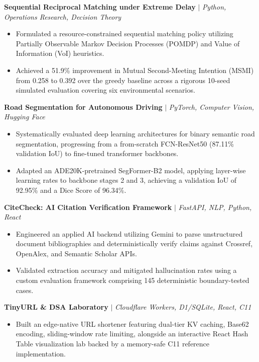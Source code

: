 \documentclass[10pt, a4paper]{article}
\begin{document}
\textbf{Sequential Reciprocal Matching under Extreme Delay} $|$ \textit{Python, Operations Research, Decision Theory}
\begin{itemize}[leftmargin=*, noitemsep, topsep=1pt, parsep=0pt]
    \item Formulated a resource-constrained sequential matching policy utilizing Partially Observable Markov Decision Processes (POMDP) and Value of Information (VoI) heuristics.
    \item Achieved a 51.9\% improvement in Mutual Second-Meeting Intention (MSMI) from 0.258 to 0.392 over the greedy baseline across a rigorous 10-seed simulated evaluation covering six environmental scenarios.
\end{itemize}

\textbf{Road Segmentation for Autonomous Driving} $|$ \textit{PyTorch, Computer Vision, Hugging Face}
\begin{itemize}[leftmargin=*, noitemsep, topsep=1pt, parsep=0pt]
    \item Systematically evaluated deep learning architectures for binary semantic road segmentation, progressing from a from-scratch FCN-ResNet50 (87.11\% validation IoU) to fine-tuned transformer backbones.
    \item Adapted an ADE20K-pretrained SegFormer-B2 model, applying layer-wise learning rates to backbone stages 2 and 3, achieving a validation IoU of 92.95\% and a Dice Score of 96.34\%.
\end{itemize}

\textbf{CiteCheck: AI Citation Verification Framework} $|$ \textit{FastAPI, NLP, Python, React}
\begin{itemize}[leftmargin=*, noitemsep, topsep=1pt, parsep=0pt]
    \item Engineered an applied AI backend utilizing Gemini to parse unstructured document bibliographies and deterministically verify claims against Crossref, OpenAlex, and Semantic Scholar APIs.
    \item Validated extraction accuracy and mitigated hallucination rates using a custom evaluation framework comprising 145 deterministic boundary-tested cases.
\end{itemize}

\textbf{TinyURL \& DSA Laboratory} $|$ \textit{Cloudflare Workers, D1/SQLite, React, C11}
\begin{itemize}[leftmargin=*, noitemsep, topsep=1pt, parsep=0pt]
    \item Built an edge-native URL shortener featuring dual-tier KV caching, Base62 encoding, sliding-window rate limiting, alongside an interactive React Hash Table visualization lab backed by a memory-safe C11 reference implementation.
\end{itemize}
\end{document}
